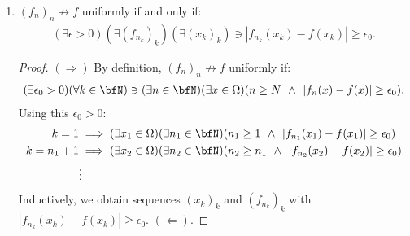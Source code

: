 \begin{enumerate}[label = (\arabic*)]
        \item $(f_n)_n \not\rightarrow f$ uniformly if and only if:
            \begin{equation*}
            \begin{split}
                (\exists \epsilon > 0)(\exists (f_{n_k})_k)(\exists (x_k)_k) \ni |f_{n_k}(x_k) - f(x_k)| \geq \epsilon_0.
            \end{split}
            \end{equation*}
            {\begin{proof}
                $(\Rightarrow)$ By definition, $(f_n)_n \not\rightarrow f$ uniformly if:
                    \begin{equation*}
                    \begin{split}
                        (\exists \epsilon_0 > 0)(\forall k \in \bfN) \ni (\exists n \in \bfN)(\exists x \in \Omega)(n \geq N \hspace{4pt}\land\hspace{4pt} |f_n(x) - f(x)| \geq \epsilon_0).
                    \end{split}
                    \end{equation*}
                Using this $\epsilon_0 > 0$:
                    \begin{equation*}
                    \begin{split}
                        k = 1 &\implies (\exists x_1 \in \Omega)(\exists n_1 \in \bfN)(n_1 \geq 1 \hspace{4pt}\land\hspace{4pt} |f_{n_1}(x_1) - f(x_1)| \geq \epsilon_0) \\
                        k = n_1 + 1 &\implies (\exists x_2 \in \Omega)(\exists n_2 \in \bfN)(n_2 \geq n_1 \hspace{4pt}\land\hspace{4pt} |f_{n_2}(x_2) - f(x_2)| \geq \epsilon_0) \\
                        &\vdots 
                    \end{split}
                    \end{equation*}
                Inductively, we obtain sequences $(x_k)_k$ and $(f_{n_k})_k$ with $|f_{n_k}(x_k) - f(x_k)| \geq \epsilon_0$. $(\Leftarrow)$.
            \end{proof}}


\end{enumerate}
